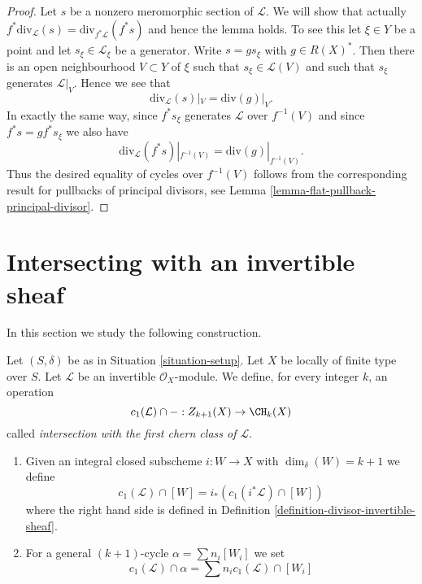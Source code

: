 \begin{proof}
Let $s$ be a nonzero meromorphic section of $\mathcal{L}$.
We will show that actually
$f^*\text{div}_\mathcal{L}(s) = \text{div}_{f^*\mathcal{L}}(f^*s)$
and hence the lemma holds.
To see this let $\xi \in Y$ be a point and let $s_\xi \in \mathcal{L}_\xi$
be a generator. Write $s = gs_\xi$ with $g \in R(X)^*$.
Then there is an open neighbourhood $V \subset Y$ of $\xi$
such that $s_\xi \in \mathcal{L}(V)$ and such that $s_\xi$ generates
$\mathcal{L}|_V$. Hence we see that
$$
\text{div}_\mathcal{L}(s)|_V = \text{div}(g)|_V.
$$
In exactly the same way, since $f^*s_\xi$ generates $\mathcal{L}$
over $f^{-1}(V)$ and since $f^*s = g f^*s_\xi$ we also
have
$$
\text{div}_\mathcal{L}(f^*s)|_{f^{-1}(V)}
=
\text{div}(g)|_{f^{-1}(V)}.
$$
Thus the desired equality of cycles over $f^{-1}(V)$ follows from the
corresponding result for pullbacks of principal divisors, see
Lemma \ref{lemma-flat-pullback-principal-divisor}.
\end{proof}



\section{Intersecting with an invertible sheaf}
\label{section-intersecting-with-divisors}

\noindent
In this section we study the following construction.

\begin{definition}
\label{definition-cap-c1}
Let $(S, \delta)$ be as in Situation \ref{situation-setup}.
Let $X$ be locally of finite type over $S$.
Let $\mathcal{L}$ be an invertible $\mathcal{O}_X$-module.
We define, for every integer $k$, an operation
$$
c_1(\mathcal{L}) \cap - :
Z_{k + 1}(X) \to \CH_k(X)
$$
called {\it intersection with the first chern class of $\mathcal{L}$}.
\begin{enumerate}
\item Given an integral closed subscheme $i : W \to X$ with
$\dim_\delta(W) = k + 1$ we define
$$
c_1(\mathcal{L}) \cap [W] = i_*(c_1({i^*\mathcal{L}}) \cap [W])
$$
where the right hand side is defined in
Definition \ref{definition-divisor-invertible-sheaf}.
\item For a general $(k + 1)$-cycle $\alpha = \sum n_i [W_i]$ we set
$$
c_1(\mathcal{L}) \cap \alpha = \sum n_i c_1(\mathcal{L}) \cap [W_i]
$$
\end{enumerate}
\end{definition}

